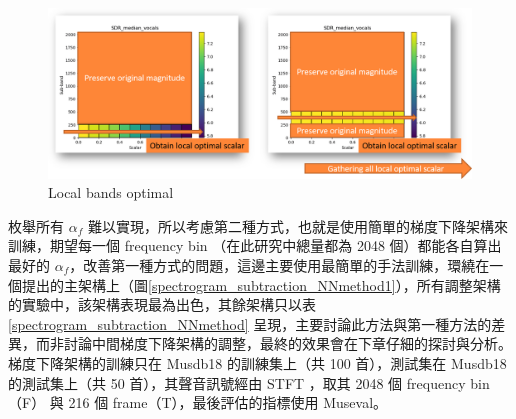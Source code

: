 \begin{figure}[htbp]
    \hfil
    \begin{minipage}[t]{0.65\textwidth}
        \includegraphics[width=\textwidth]{./figures/chapter04_experiment/Local_Bands_Optimal3.png}
        \caption {Local bands optimal}
        \label{Local_Bands_Optimal3}
    \end{minipage}
    \hfil
\end{figure}

枚舉所有 $\alpha_f$ 難以實現，所以考慮第二種方式，也就是使用簡單的梯度下降架構來訓練，期望每一個 frequency bin （在此研究中總量都為 2048 個）都能各自算出最好的 $\alpha_f$，改善第一種方式的問題，這邊主要使用最簡單的手法訓練，環繞在一個提出的主架構上（圖\ref{spectrogram_subtraction_NNmethod1}），所有調整架構的實驗中，該架構表現最為出色，其餘架構只以表\ref{spectrogram_subtraction_NNmethod} 呈現，主要討論此方法與第一種方法的差異，而非討論中間梯度下降架構的調整，最終的效果會在下章仔細的探討與分析。梯度下降架構的訓練只在 Musdb18 的訓練集上（共 100 首），測試集在 Musdb18 的測試集上（共 50 首），其聲音訊號經由 STFT ，取其 2048 個 frequency bin （F） 與 216 個 frame（T），最後評估的指標使用 Museval。

\begin{table}[htbp]
\centering
{}
\caption{過程中梯度下降架構的調整}
\label{spectrogram_subtraction_NNmethod}
\end{table}

